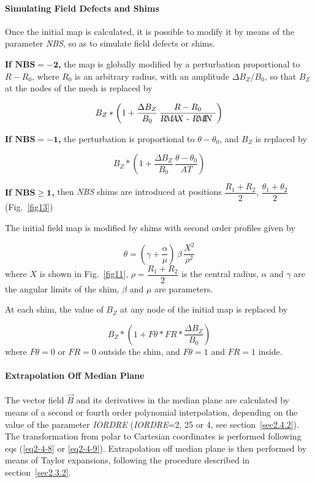 \paragraph{Simulating Field Defects and Shims }

\noindent Once the initial map is calculated, it is possible to modify it by
means of the parameter \textsl{NBS}, so as to simulate field defects or shims. 
\bigskip

\noindent\textbf{If $\mathbf{NBS = - 2}$,} the map is globally modified by a
perturbation proportional to $ R-R_0 $, 
where $ R_0 $ is an arbitrary radius, with an amplitude $ \Delta B_Z/B_0 $, so
that $ B_Z $ at the nodes of the mesh is replaced by 

$$ B_Z  \ast   \left(1+ \frac{\Delta B_Z }{ B_0}\, \frac{R-R_0 }{\text{\textsl{R\!M\!A\!X }- \textsl{R\!M\!I\!N }}} \right) $$

\noindent\textbf{If  $\mathbf{NBS =  - 1}$,} the perturbation is proportional to
$ \theta -\theta_ 0 $, and $ B_Z $ is replaced by 

$$ B_Z \ast  \left(1+ \frac{\Delta B_Z }{ B_0} \, \frac{\theta -\theta_ 0 }{ AT}\right) $$

\noindent\textbf{If  $\mathbf{NBS \geq 1}$,} then \textsl{NBS} shims are introduced at
positions $ \dfrac{ R_1+R_2 }{ 2}$, $\dfrac{\theta_ 1+\theta_ 2 }{ 2} $ 
(Fig.~\ref{fig13})~\cite{Biblio13}   %

\noindent The initial field map is modified by shims with second order profiles given by 

$$ \theta  = \left(\gamma  + \frac{\alpha }{ \mu} \right) \,\beta\, \frac{X^2 }{\rho^ 2} $$
%
 where $ X $ is shown in  Fig.~\ref{fig11}, 
 $\rho = \dfrac{R_1+R_2 }{ 2} $ is the central radius, $\alpha$ and $\gamma$ are the angular 
 limits of the shim, $\beta$ and $\mu$ are parameters. 
 
\noindent At each shim, the value of $ B_Z $ at any node of the initial map is replaced by 

$$ B_Z \ast  \left(1+F\theta  \ast  FR \ast  \frac{\Delta B_Z }{ B_0} \right)
$$
%
 where $ F\theta =0 $ or $ FR=0 $ outside the shim, and $ F\theta =1$ and $ FR=1 $ inside.  
\bigskip

\paragraph{Extrapolation Off Median Plane} 

\noindent The vector field $ \vec  B $ and its derivatives in the median plane
are calculated by means of a second or fourth order polynomial 
interpolation, depending 
on the value of the parameter \textsl{IORDRE} (\textsl{IORDRE}=2, 25 or 4, see 
section~\ref{sec2.4.2}). 
The transformation from polar to Cartesian coordinates is 
performed following eqs (\ref{eq2-4-8} or \ref{eq2-4-9}). Extrapolation off median plane is then 
performed by means of Taylor expansions, following the procedure described 
in section~\ref{sec2.3.2}. 









